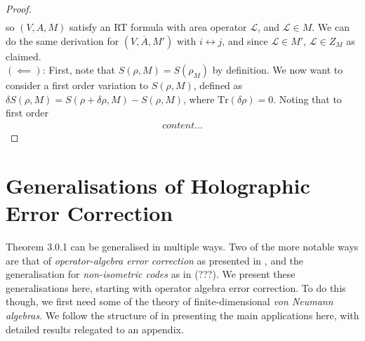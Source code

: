 \documentclass[12pt,a4paper]{report}
\numberwithin{equation}{section}
\newcommand{\ol}[1]{\overline{#1}}
\newcommand{\tr}{\text{Tr}}
\theoremstyle{definition}
\theoremstyle{theorem}
\theoremstyle{theorem}
\theoremstyle{example}
\theoremstyle{definition}
\begin{document}
\begin{proof}
\begin{equation}
\begin{aligned}
		\end{aligned}
	\end{equation}
	so $(V,A,M)$ satisfy an RT formula with area operator $\mathcal{L}$, and $\mathcal{L}\in M$. We can do the same derivation for $(V,\ol{A},M')$ with $i\leftrightarrow j$, and since $\mathcal{L}\in M'$, $\mathcal{L}\in Z_{M}$ as claimed.\\
	$(\impliedby)$: First, note that $S(\rho,M)=S(\rho_{M})$ by definition. We now want to consider a first order variation to $S(\rho,M)$, defined as $\delta S(\rho,M)=S(\rho+\delta\rho,M)-S(\rho,M)$, where $\tr(\delta\rho)=0$. Noting that to first order
	\begin{equation}
		\begin{aligned}
			content...
		\end{aligned}
	\end{equation}
\end{proof}

\chapter{Generalisations of Holographic Error Correction}
Theorem 3.0.1 can be generalised in multiple ways. Two of the more notable ways are that of \textit{operator-algebra error correction} as presented in \cite{Harlow}, and the generalisation for \textit{non-isometric codes} as in (???). We present these generalisations here, starting with operator algebra error correction. To do this though, we first need some of the theory of finite-dimensional \textit{von Neumann algebras}. We follow the structure of \cite{Harlow} in presenting the main applications here, with detailed results relegated to an appendix.
\end{document}
